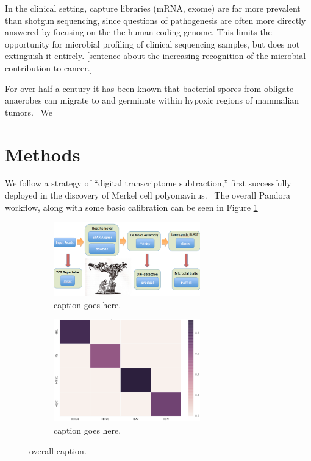 \documentclass[twocolumn,11pt]{article}
\begin{document}
In the clinical setting, capture libraries (mRNA, exome) are far more prevalent than shotgun sequencing, since questions of pathogenesis are often more directly answered by focusing on the the human coding genome.
This limits the opportunity for microbial profiling of clinical sequencing samples, but does not extinguish it entirely.
[sentence about the increasing recognition of the microbial contribution to cancer.]


For over half a century it has been known that bacterial spores from obligate anaerobes can migrate to and germinate within hypoxic regions of mammalian tumors.~\cite{malmgren1955localization}
We 



\section*{Methods}

We follow a strategy of ``digital transcriptome subtraction,'' first successfully deployed in the discovery of Merkel cell polyomavirus.~\cite{feng2008clonal}
The overall Pandora workflow, along with some basic calibration can be seen in Figure \ref{fig:pipeline}

\begin{figure}
    \begin{subfigure}{0.5\textwidth}
    \centering
    \includegraphics[width=2.5in]{fig/schematic.png}
    \caption{caption goes here.}
    \end{subfigure}
    
    \begin{subfigure}{0.5\textwidth}
    \centering
    \includegraphics[width=2.5in]{fig/sensitivity_panel.png}
    \caption{caption goes here.}
    \end{subfigure}

    \caption{overall caption.}
    \label{fig:pipeline}
\end{figure}
\end{document}
